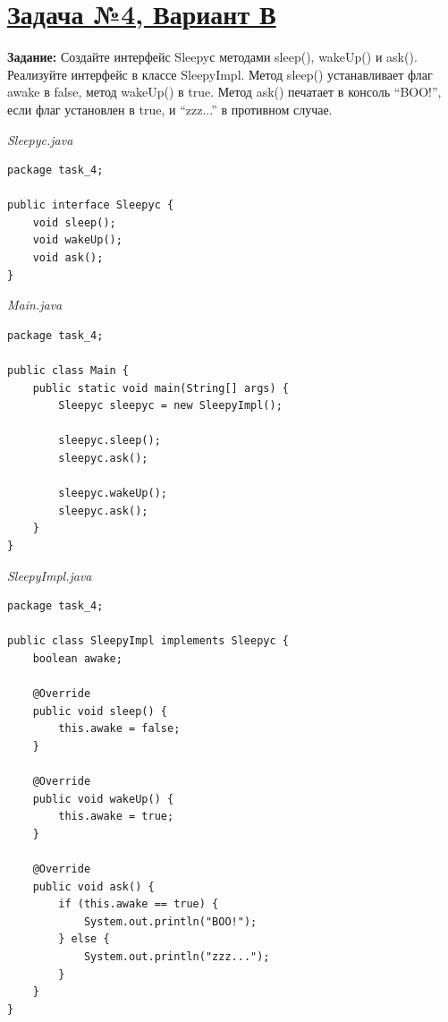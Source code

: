 \documentclass[a4paper]{article}
\begin{document}
\section{\href{https://github.com/yarvod/NetCracker_LearningCenter/tree/main/Practise_tasks/Practice_task_1}{Задача №4, Вариант В}}

\textbf{Задание: }Создайте интерфейс Sleepyс методами sleep(), wakeUp() и ask(). Реализуйте интерфейс в классе SleepyImpl. Метод sleep() устанавливает флаг awake в false, метод wakeUp() в true. Метод ask() печатает в консоль “BOO!”, если флаг установлен в true, и “zzz...” в противном случае. \par


\begin{minipage}{0.5\textwidth}
    \textit{Sleepyc.java}
    \begin{lstlisting}
package task_4;

public interface Sleepyc {
    void sleep();
    void wakeUp();
    void ask();
}
\end{lstlisting}
\textit{Main.java}
\begin{lstlisting}
package task_4;

public class Main {
    public static void main(String[] args) {
        Sleepyc sleepyc = new SleepyImpl();

        sleepyc.sleep();
        sleepyc.ask();

        sleepyc.wakeUp();
        sleepyc.ask();
    }
}
\end{lstlisting}
\end{minipage}
\hfill
\begin{minipage}{0.5\textwidth}
\textit{SleepyImpl.java}
\begin{lstlisting}
package task_4;

public class SleepyImpl implements Sleepyc {
    boolean awake;

    @Override
    public void sleep() {
        this.awake = false;
    }

    @Override
    public void wakeUp() {
        this.awake = true;
    }

    @Override
    public void ask() {
        if (this.awake == true) {
            System.out.println("BOO!");
        } else {
            System.out.println("zzz...");
        }
    }
}
    
\end{lstlisting}
\end{minipage}
\end{document}
